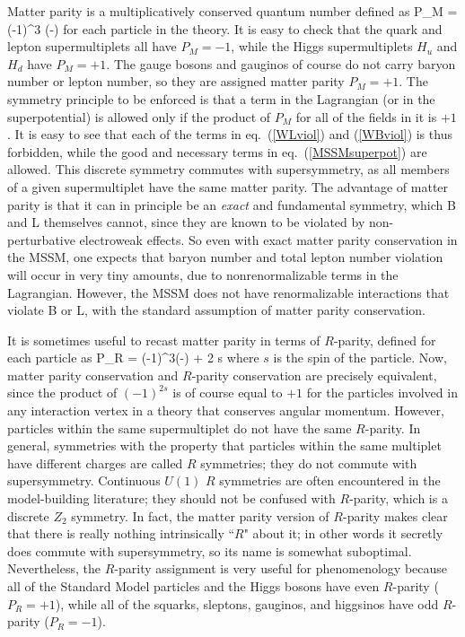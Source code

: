Matter parity is a multiplicatively
conserved quantum number
defined as
\beq
P_M = (-1)^{3 (\Baryon-\Lepton)}
\label{defmatterparity}
\eeq
for each particle in the theory.
It is easy to check that the quark and lepton
supermultiplets all have $P_M=-1$, while the Higgs supermultiplets $H_u$
and $H_d$ have $P_M=+1$.
The gauge bosons and gauginos of course do not carry baryon number or
lepton number, so they are assigned matter parity $P_M=+1$.
The symmetry principle to be enforced is
that a term in the Lagrangian (or in the superpotential) is allowed only if
the product of $P_M$ for all of the fields in it is $+1$. It is easy
to see that each of the terms in
eq.~(\ref{WLviol}) and (\ref{WBviol}) is thus forbidden, while the
good and necessary
terms in eq.~(\ref{MSSMsuperpot}) are allowed.
This discrete symmetry commutes with supersymmetry,
as all members of a given supermultiplet have the same matter parity.
The advantage of matter
parity is that it can in principle be an {\it exact} and
fundamental symmetry, which
B and L themselves cannot, since they are known to be violated by
non-perturbative electroweak effects. So even with exact matter parity
conservation in the MSSM,
one expects that baryon number
and total lepton number violation will occur in very tiny amounts, due to
nonrenormalizable
terms in the Lagrangian. However, the
MSSM does not have renormalizable interactions that violate B or
L, with the standard assumption of matter parity conservation.

It is sometimes useful to recast matter parity in terms of $R$-parity,
defined for each particle as
\beq
P_R = (-1)^{3(\Baryon-\Lepton) + 2 s}
\label{defRparity}
\eeq
where $s$ is the spin of the particle. Now,
matter parity conservation and $R$-parity conservation are precisely
equivalent, since the product of $(-1)^{2s}$ is of course equal to $+1$
for the particles involved in any interaction
vertex in a theory that conserves angular momentum.
However, particles within the same supermultiplet do not have the
same $R$-parity. In general, symmetries with the
property that particles within the same multiplet have different
charges are called
$R$ symmetries; they do not commute with
supersymmetry.  Continuous $U(1)$ $R$ symmetries are 
often encountered in the model-building literature; they should not be 
confused with $R$-parity, which is a discrete $Z_2$ symmetry.
In fact, the matter parity version 
of $R$-parity makes clear
that there is really nothing intrinsically
``$R$" about it; in other words it
secretly does commute with supersymmetry, so its name is somewhat
suboptimal. Nevertheless, the $R$-parity assignment
is very useful for phenomenology because all of the Standard Model particles
and the Higgs bosons have even $R$-parity ($P_R=+1$), while all of the
squarks, sleptons, gauginos, and higgsinos have odd $R$-parity ($P_R=-1$).

